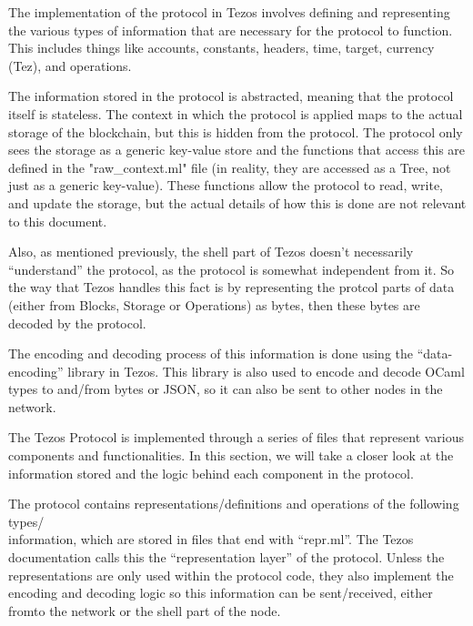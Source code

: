 The implementation of the protocol in Tezos involves defining and representing the various types of information that are necessary for the protocol to function. This includes things like accounts, constants, headers, time, target, currency (Tez), and operations.

The information stored in the protocol is abstracted, meaning that the protocol itself is stateless. The context in which the protocol is applied maps to the actual storage of the blockchain, but this is hidden from the protocol. The protocol only sees the storage as a generic key-value store and the functions that access this are defined in the "raw\_context.ml" file (in reality, they are accessed as a Tree, not just as a generic key-value). These functions allow the protocol to read, write, and update the storage, but the actual details of how this is done are not relevant to this document.

Also, as mentioned previously, the shell part of Tezos doesn't necessarily ``understand'' the protocol, as the protocol is somewhat independent from it. So the way that Tezos handles this fact is by representing the protcol parts of data (either from Blocks, Storage or Operations) as bytes, then these bytes are decoded by the protocol.

The encoding and decoding process of this information is done using the ``data-encoding'' library in Tezos. This library is also used to encode and decode OCaml types to and/from bytes or JSON, so it can also be sent to other nodes in the network.

The Tezos Protocol is implemented through a series of files that represent various components and functionalities. In this section, we will take a closer look at the information stored and the logic behind each component in the protocol.

The protocol contains representations/definitions and operations of the following types/\\information, which are stored in files that end with ``repr.ml''. 
The Tezos documentation calls this the ``representation layer'' of the protocol. Unless the representations are only used within the protocol code, they also implement the encoding and decoding logic so this information can be sent/received, either from\/to the network or the shell part of the node.

